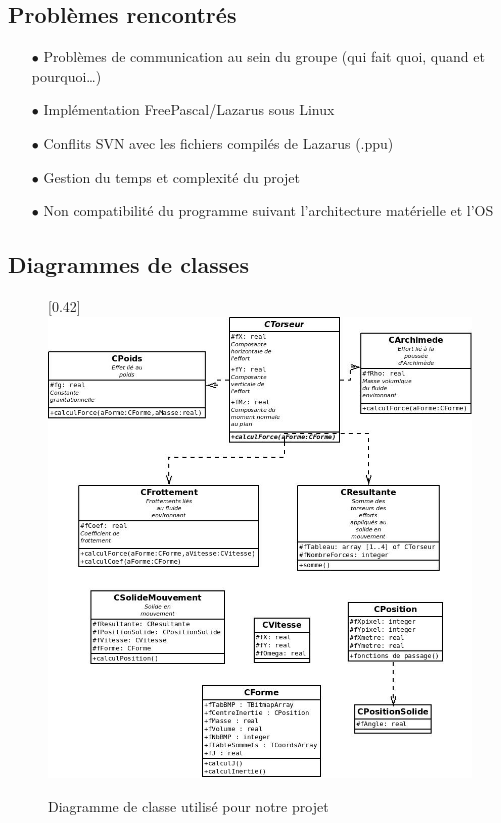 \subsection{Problèmes rencontrés}
\begin{itemize}
\item[$\bullet$] Problèmes de communication au sein du groupe (qui fait quoi, quand et pourquoi\dots )
\item[$\bullet$] Implémentation FreePascal/Lazarus sous Linux
\item[$\bullet$] Conflits SVN avec les fichiers compilés de Lazarus (.ppu)
\item[$\bullet$] Gestion du temps et complexité du projet
\item[$\bullet$] Non compatibilité du programme suivant l'architecture matérielle et l'OS
\end{itemize}

\newpage
\subsection{Diagrammes de classes}

\begin{center}
\begin{figure}[h]
\begin{center}
\scalebox{0.5}[0.42]{\includegraphics*{../images/UML.jpeg}}
\end{center}
\caption{Diagramme de classe utilisé pour notre projet}
\end{figure}
\end{center}

